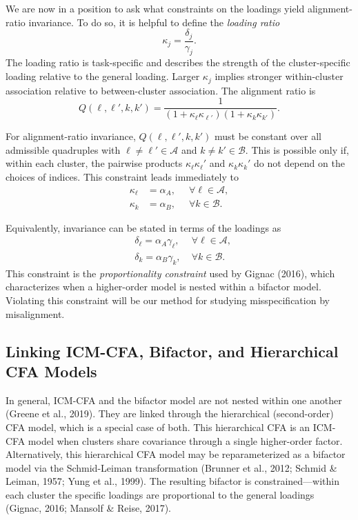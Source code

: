 \documentclass[
  american,
  man,floatsintext]{apa7}
\begin{document}
We are now in a position to ask what constraints on the loadings yield alignment-ratio invariance. To do so, it is helpful to define the \emph{loading ratio}
\[
\kappa_j=\frac{\delta_{j}}{\gamma_{j}}.
\]
The loading ratio is task-specific and describes the strength of the cluster-specific loading relative to the general loading. Larger \(\kappa_j\) implies stronger within-cluster association relative to between-cluster association. The alignment ratio is
\[
Q(\ell,\ell',k,k')=
\frac{1}{(1+\kappa_\ell\kappa_{\ell'})(1+\kappa_k\kappa_{k'})}.
\]

For alignment-ratio invariance, \(Q(\ell,\ell',k,k')\) must be constant over all admissible quadruples with \(\ell \neq \ell'\in\mathcal A\) and \(k \neq k'\in\mathcal B\). This is possible only if, within each cluster, the pairwise products \(\kappa_\ell\kappa_\ell'\) and \(\kappa_k\kappa_k'\) do not depend on the choices of indices. This constraint leads immediately to
\[
\begin{aligned}
\kappa_\ell&=\alpha_A, \; &\forall \ell\in\mathcal A,\\
\kappa_k& =\alpha_B, \;\; &\forall k\in\mathcal B.
\end{aligned}
\]

Equivalently, invariance can be stated in terms of the loadings as
\[
\begin{aligned}
&\delta_\ell = \alpha_A \gamma_\ell, \; &\forall \ell\in\mathcal A,\\
&\delta_k = \alpha_B \gamma_k, \; &\forall k\in\mathcal B.
\end{aligned}
\]
This constraint is the \emph{proportionality constraint} used by Gignac (2016), which characterizes when a higher-order model is nested within a bifactor model. Violating this constraint will be our method for studying misspecification by misalignment.

\subsection{Linking ICM-CFA, Bifactor, and Hierarchical CFA Models}\label{linking-icm-cfa-bifactor-and-hierarchical-cfa-models}

In general, ICM-CFA and the bifactor model are not nested within one another (Greene et al., 2019). They are linked through the hierarchical (second-order) CFA model, which is a special case of both. This hierarchical CFA is an ICM-CFA model when clusters share covariance through a single higher-order factor. Alternatively, this hierarchical CFA model may be reparameterized as a bifactor model via the Schmid-Leiman transformation (Brunner et al., 2012; Schmid \& Leiman, 1957; Yung et al., 1999). The resulting bifactor is constrained---within each cluster the specific loadings are proportional to the general loadings (Gignac, 2016; Mansolf \& Reise, 2017).
\end{document}
